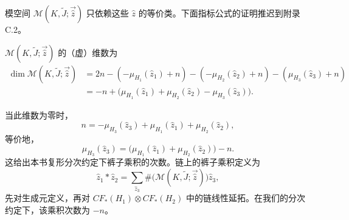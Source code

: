 模空间 $\mathcal M(K,\widetilde J;\vec{\widehat z})$ 只依赖这些
$\widehat z$ 的等价类。下面指标公式的证明推迟到附录 C.2。

\begin{proposition}
\label{prop:20-pants-virtual-dimension}
$\mathcal M(K,\widetilde J;\vec{\widehat z})$ 的（虚）维数为
\[
 \begin{aligned}
 \dim\mathcal M(K,\widetilde J;\vec{\widehat z})
 &=2n-(-\mu_{H_1}(\widehat z_1)+n)-(-\mu_{H_2}(\widehat z_2)+n)
 -(\mu_{H_3}(\widehat z_3)+n)\\
 &=-n+\bigl(\mu_{H_1}(\widehat z_1)+\mu_{H_2}(\widehat z_2)
 -\mu_{H_3}(\widehat z_3)\bigr).
 \end{aligned}
\]
\end{proposition}

当此维数为零时，
\[
 n=-\mu_{H_3}(\widehat z_3)+\mu_{H_1}(\widehat z_1)+\mu_{H_2}(\widehat z_2),
\]
等价地，
\[
 \mu_{H_3}(\widehat z_3)=
 \bigl(\mu_{H_1}(\widehat z_1)+\mu_{H_2}(\widehat z_2)\bigr)-n.
\]
这给出本书\personFloer{}复形分次约定下裤子乘积的次数。链上的裤子乘积定义为
\begin{equation}
 \widehat z_1*\widehat z_2
 =\sum_{\widehat z_3}\#\bigl(\mathcal M(K,\widetilde J;
 \vec{\widehat z})\bigr)\widehat z_3,
 \label{eq:20-pants-product}
\end{equation}
先对生成元定义，再对 $CF_*(H_1)\otimes CF_*(H_2)$ 中的链线性延拓。在我们的分次
约定下，该乘积次数为 $-n$。
